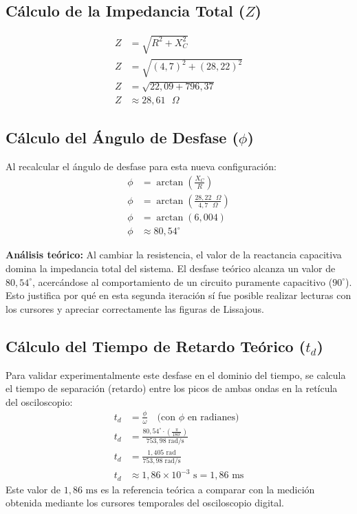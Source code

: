 \documentclass[11pt, letterpaper]{article}
\begin{document}
\subsection*{Cálculo de la Impedancia Total ($Z$)}
\begin{align*}
    Z &= \sqrt{R^2 + X_C^2} \\
    Z &= \sqrt{(4,7)^2 + (28,22)^2} \\
    Z &= \sqrt{22,09 + 796,37} \\
    Z &\approx 28,61\text{ }\Omega
\end{align*}

\subsection*{Cálculo del Ángulo de Desfase ($\phi$)}
Al recalcular el ángulo de desfase para esta nueva configuración:
\begin{align*}
    \phi &= \arctan\left(\frac{X_C}{R}\right) \\
    \phi &= \arctan\left(\frac{28,22\text{ }\Omega}{4,7\text{ }\Omega}\right) \\
    \phi &= \arctan(6,004) \\
    \phi &\approx 80,54^\circ
\end{align*}

\textbf{Análisis teórico:} Al cambiar la resistencia, el valor de la reactancia capacitiva domina la impedancia total del sistema. El desfase teórico alcanza un valor de $80,54^\circ$, acercándose al comportamiento de un circuito puramente capacitivo ($90^\circ$). Esto justifica por qué en esta segunda iteración sí fue posible realizar lecturas con los cursores y apreciar correctamente las figuras de Lissajous.

\subsection*{Cálculo del Tiempo de Retardo Teórico ($t_d$)}
Para validar experimentalmente este desfase en el dominio del tiempo, se calcula el tiempo de separación (retardo) entre los picos de ambas ondas en la retícula del osciloscopio:
\begin{align*}
    t_d &= \frac{\phi}{\omega} \quad \text{(con } \phi \text{ en radianes)} \\
    t_d &= \frac{80,54^\circ \cdot \left(\frac{\pi}{180^\circ}\right)}{753,98\text{ rad/s}} \\
    t_d &= \frac{1,405\text{ rad}}{753,98\text{ rad/s}} \\
    t_d &\approx 1,86 \times 10^{-3}\text{ s} = 1,86\text{ ms}
\end{align*}
Este valor de $1,86\text{ ms}$ es la referencia teórica a comparar con la medición obtenida mediante los cursores temporales del osciloscopio digital.
\end{document}
